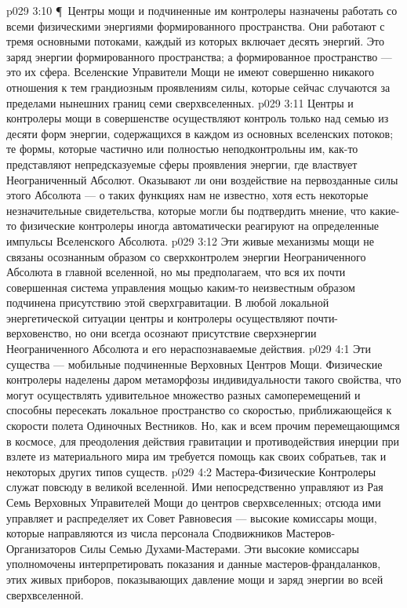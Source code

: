 \vs p029 3:10 \P\ Центры мощи и подчиненные им контролеры назначены работать со всеми физическими энергиями формированного пространства. Они работают с тремя основными потоками, каждый из которых включает десять энергий. Это заряд энергии формированного пространства; а формированное пространство --- это их сфера. Вселенские Управители Мощи не имеют совершенно никакого отношения к тем грандиозным проявлениям силы, которые сейчас случаются за пределами нынешних границ семи сверхвселенных.
\vs p029 3:11 Центры и контролеры мощи в совершенстве осуществляют контроль только над семью из десяти форм энергии, содержащихся в каждом из основных вселенских потоков; те формы, которые частично или полностью неподконтрольны им, как\hyp{}то представляют непредсказуемые сферы проявления энергии, где властвует Неограниченный Абсолют. Оказывают ли они воздействие на первозданные силы этого Абсолюта --- о таких функциях нам не известно, хотя есть некоторые незначительные свидетельства, которые могли бы подтвердить мнение, что какие\hyp{}то физические контролеры иногда автоматически реагируют на определенные импульсы Вселенского Абсолюта.
\vs p029 3:12 Эти живые механизмы мощи не связаны осознанным образом со сверхконтролем энергии Неограниченного Абсолюта в главной вселенной, но мы предполагаем, что вся их почти совершенная система управления мощью каким\hyp{}то неизвестным образом подчинена присутствию этой сверхгравитации. В любой локальной энергетической ситуации центры и контролеры осуществляют почти\hyp{}верховенство, но они всегда осознают присутствие сверхэнергии Неограниченного Абсолюта и его нераспознаваемые действия.
\vs p029 4:1 Эти существа --- мобильные подчиненные Верховных Центров Мощи. Физические контролеры наделены даром метаморфозы индивидуальности такого свойства, что могут осуществлять удивительное множество разных самоперемещений и способны пересекать локальное пространство со скоростью, приближающейся к скорости полета Одиночных Вестников. Но, как и всем прочим перемещающимся в космосе, для преодоления действия гравитации и противодействия инерции при взлете из материального мира им требуется помощь как своих собратьев, так и некоторых других типов существ.
\vs p029 4:2 Мастера\hyp{}Физические Контролеры служат повсюду в великой вселенной. Ими непосредственно управляют из Рая Семь Верховных Управителей Мощи до центров сверхвселенных; отсюда ими управляет и распределяет их Совет Равновесия --- высокие комиссары мощи, которые направляются из числа персонала Сподвижников Мастеров\hyp{}Организаторов Силы Семью Духами\hyp{}Мастерами. Эти высокие комиссары уполномочены интерпретировать показания и данные мастеров\hyp{}франдаланков, этих живых приборов, показывающих давление мощи и заряд энергии во всей сверхвселенной.
